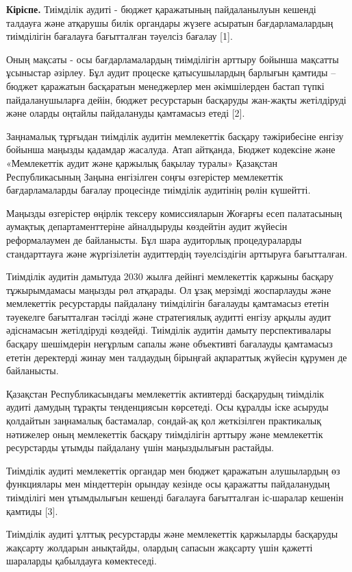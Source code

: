 {\bfseries Кіріспе.} Тиімділік аудиті - бюджет қаражатының пайдаланылуын
кешенді талдауға және атқарушы билік органдары жүзеге асыратын
бағдарламалардың тиімділігін бағалауға бағытталған тәуелсіз бағалау
{[}1{]}.

Оның мақсаты - осы бағдарламалардың тиімділігін арттыру бойынша мақсатты
ұсыныстар әзірлеу. Бұл аудит процеске қатысушылардың барлығын қамтиды --
бюджет қаражатын басқаратын менеджерлер мен әкімшілерден бастап түпкі
пайдаланушыларға дейін, бюджет ресурстарын басқаруды жан-жақты
жетілдіруді және оларды оңтайлы пайдалануды қамтамасыз етеді {[}2{]}.

Заңнамалық тұрғыдан тиімділік аудитін мемлекеттік басқару тәжірибесіне
енгізу бойынша маңызды қадамдар жасалуда. Атап айтқанда, Бюджет
кодексіне және «Мемлекеттік аудит және қаржылық бақылау туралы»
Қазақстан Республикасының Заңына енгізілген соңғы өзгерістер мемлекеттік
бағдарламаларды бағалау процесінде тиімділік аудитінің рөлін күшейтті.

Маңызды өзгерістер өңірлік тексеру комиссияларын Жоғарғы есеп
палатасының аумақтық департаменттеріне айналдыруды көздейтін аудит
жүйесін реформалаумен де байланысты. Бұл шара аудиторлық процедураларды
стандарттауға және жүргізілетін аудиттердің тәуелсіздігін арттыруға
бағытталған.

Тиімділік аудитін дамытуда 2030 жылға дейінгі мемлекеттік қаржыны
басқару тұжырымдамасы маңызды рөл атқарады. Ол ұзақ мерзімді жоспарлауды
және мемлекеттік ресурстарды пайдалану тиімділігін бағалауды қамтамасыз
ететін тәуекелге бағытталған тәсілді және стратегиялық аудитті енгізу
арқылы аудит әдіснамасын жетілдіруді көздейді. Тиімділік аудитін дамыту
перспективалары басқару шешімдерін неғұрлым сапалы және объективті
бағалауды қамтамасыз ететін деректерді жинау мен талдаудың бірыңғай
ақпараттық жүйесін құрумен де байланысты.

Қазақстан Республикасындағы мемлекеттік активтерді басқарудың тиімділік
аудиті дамудың тұрақты тенденциясын көрсетеді. Осы құралды іске асыруды
қолдайтын заңнамалық бастамалар, сондай-ақ қол жеткізілген практикалық
нәтижелер оның мемлекеттік басқару тиімділігін арттыру және мемлекеттік
ресурстарды ұтымды пайдалану үшін маңыздылығын растайды.

Тиімділік аудиті мемлекеттік органдар мен бюджет қаражатын алушылардың
өз функциялары мен міндеттерін орындау кезінде осы қаражатты
пайдаланудың тиімділігі мен ұтымдылығын кешенді бағалауға бағытталған
іс-шаралар кешенін қамтиды {[}3{]}.

Тиімділік аудиті ұлттық ресурстарды және мемлекеттік қаржыларды
басқаруды жақсарту жолдарын анықтайды, олардың сапасын жақсарту үшін
қажетті шараларды қабылдауға көмектеседі.


